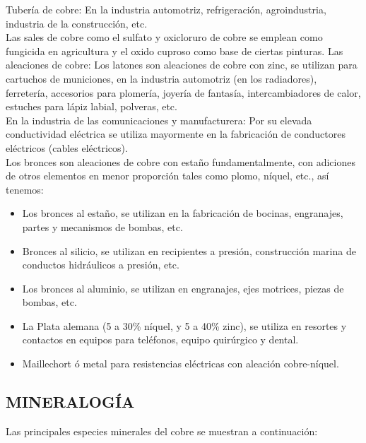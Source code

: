 Tuber\'ia de cobre: En la industria automotriz, refrigeraci\'on, agroindustria, industria de la construcci\'on, etc. \\
Las sales de cobre como el sulfato y oxicloruro de cobre se emplean como fungicida en agricultura y el oxido cuproso como base de ciertas pinturas.
Las aleaciones de cobre: Los latones son aleaciones de cobre con zinc, se utilizan para cartuchos de municiones, en la industria automotriz (en los radiadores), ferreter\'ia, accesorios para plomer\'ia, joyer\'ia de fantas\'ia, intercambiadores de calor, estuches para l\'apiz labial, polveras, etc. \\
En la industria de las comunicaciones y manufacturera: Por su elevada conductividad el\'ectrica se utiliza mayormente en la fabricaci\'on de conductores el\'ectricos (cables el\'ectricos).\\
Los bronces son aleaciones de cobre con esta\~no fundamentalmente, con adiciones de otros elementos en menor proporci\'on tales como plomo, n\'iquel, etc., as\'i tenemos:\\
\begin{itemize}
 \item Los bronces al esta\~no, se utilizan en la fabricaci\'on de bocinas, engranajes, partes y mecanismos de bombas, etc.
 \item Bronces al silicio, se utilizan en recipientes a presi\'on, construcci\'on marina de conductos hidr\'aulicos a presi\'on, etc.
 \item Los bronces al aluminio, se utilizan en engranajes, ejes motrices, piezas de bombas, etc.
 \item La Plata alemana (5 a 30\% n\'iquel, y 5 a 40\% zinc), se utiliza en resortes y contactos en equipos para tel\'efonos, equipo quir\'urgico y dental.
 \item Maillechort \'o metal para resistencias el\'ectricas con aleaci\'on cobre-n\'iquel.
\end{itemize}

\subsection{MINERALOG\'IA}
Las principales especies minerales del cobre se muestran a continuaci\'on:

